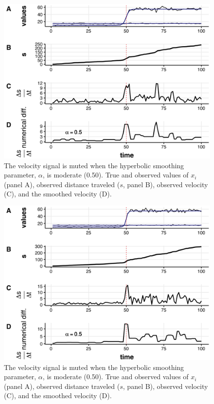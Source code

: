 \documentclass[print]{nuthesis}
\begin{document}
\newpage
\begin{figure}
\includegraphics[width=0.85\linewidth]{./chapterFiles/velocity/figsCalledInDiss/changeMuX1_tanhAlpha05-05tvdiffAlpha-1000iter_stackTvdiff} \caption{The velocity signal is muted when the  hyperbolic smoothing parameter, $\alpha$, is moderate (0.50). True and observed values of $x_i$ (panel A), observed distance traveled ($s$, panel B), observed velocity (C), and the smoothed velocity (D). }\label{fig:mu1varpt5}
\end{figure}
\newpage
\begin{figure}
\includegraphics[width=0.85\linewidth]{./chapterFiles/velocity/figsCalledInDiss/changeMuX1_tanhAlpha075-05tvdiffAlpha-1000iter_stackTvdiff} \caption{The velocity signal is muted when the  hyperbolic smoothing parameter, $\alpha$, is moderate (0.50). True and observed values of $x_i$ (panel A), observed distance traveled ($s$, panel B), observed velocity (C), and the smoothed velocity (D). }\label{fig:mu1varpt75}
\end{figure}
\end{document}
